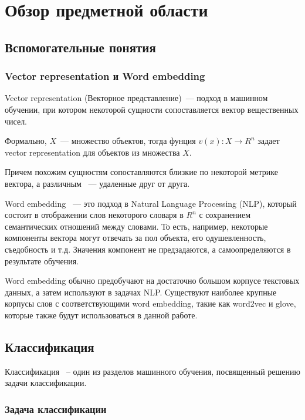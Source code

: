
\chapter{Обзор предметной области}

\section{Вспомогательные понятия}

\subsection{Vector representation и Word embedding}
Vector representation (Векторное представление)~--- подход в машинном обучении, при котором некоторой сущности
сопоставляется вектор вещественных чисел.

Формально, $X$~--- множество объектов, тогда фунция $v(x):X \rightarrow R^n$
задает vector representation для объектов из множества $X$.

Причем похожим сущностям сопоставляются близкие
по некоторой метрике вектора, а различным ~--- удаленные друг от друга.

Word embedding ~--- это подход в Natural Language Processing (NLP), который
состоит в отображении слов некоторого словаря в $R^n$ с сохранением
семантических отношений между словами. 
То есть, например, некоторые компоненты вектора могут отвечать за пол объекта,
его одушевленность, съедобность и т.д. Значения компонент не предзадаются, а самоопределяются в результате обучения.


Word embedding обычно предобучают на достаточно большом корпусе текстовых
данных, а затем используют в задачах NLP. Существуют наиболее крупные корпусы слов с соответствующими word embedding, такие как word2vec и glove, которые также будут использоваться в данной работе.


\section{Классификация}

Классификация ~-- один из разделов машинного обучения, посвященный решению
задачи классификации.

\subsection{Задача классификации}

